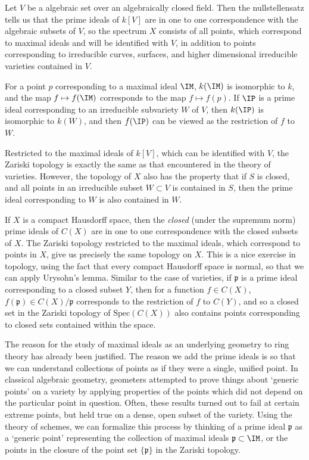 \begin{example}
    Let $V$ be a algebraic set over an algebraically closed field. Then the nullstellensatz tells us that the prime ideals of $k[V]$ are in one to one correspondence with the algebraic subsets of $V$, so the spectrum $X$ consists of all points, which correspond to maximal ideals and will be identified with $V$, in addition to points corresponding to irreducible curves, surfaces, and higher dimensional irreducible varieties contained in $V$.

    For a point $p$ corresponding to a maximal ideal $\IM$, $k(\IM)$ is isomorphic to $k$, and the map $f \mapsto f(\IM)$ corresponds to the map $f \mapsto f(p)$. If $\IP$ is a prime ideal corresponding to an irreducible subvariety $W$ of $V$, then $k(\IP)$ is isomorphic to $k(W)$, and then $f(\IP)$ can be viewed as the restriction of $f$ to $W$.

    Restricted to the maximal ideals of $k[V]$, which can be identified with $V$, the Zariski topology is exactly the same as that encountered in the theory of varieties. However, the topology of $X$ also has the property that if $S$ is closed, and all points in an irreducible subset $W \subset V$ is contained in $S$, then the prime ideal corresponding to $W$ is also contained in $W$.
\end{example}

\begin{example}
    If $X$ is a compact Hausdorff space, then the {\it closed} (under the supremum norm) prime ideals of $C(X)$ are in one to one correspondence with the closed subsets of $X$. The Zariski topology restricted to the maximal ideals, which correspond to points in $X$, give us precisely the same topology on $X$. This is a nice exercise in topology, using the fact that every compact Hausdorff space is normal, so that we can apply Urysohn's lemma. Similar to the case of varieties, if $\mathfrak{p}$ is a prime ideal corresponding to a closed subset $Y$, then for a function $f \in C(X)$, $f(\mathfrak{p}) \in C(X)/\mathfrak{p}$ corresponds to the restriction of $f$ to $C(Y)$, and so a closed set in the Zariski topology of $\text{Spec}(C(X))$ also contains points corresponding to closed sets contained within the space.
\end{example}

The reason for the study of maximal ideals as an underlying geometry to ring theory has already been justified. The reason we add the prime ideals is so that we can understand collections of points as if they were a single, unified point. In classical algebraic geometry, geometers attempted to prove things about `generic points' on a variety by applying properties of the points which did not depend on the particular point in question. Often, these results turned out to fail at certain extreme points, but held true on a dense, open subset of the variety. Using the theory of schemes, we can formalize this process by thinking of a prime ideal $\mathfrak{p}$ as a `generic point' representing the collection of maximal ideals $\mathfrak{p} \subset \IM$, or the points in the closure of the point set $\{ \mathfrak{p} \}$ in the Zariski topology.

